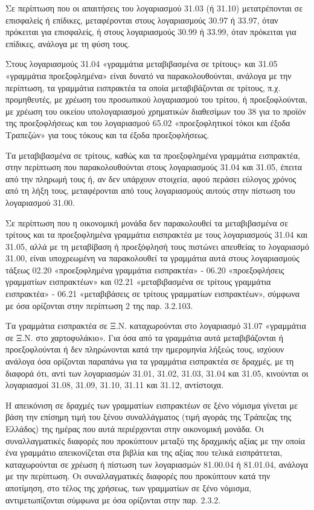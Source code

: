 \documentclass[A4,10pt,greek]{book}
\begin{document}
Σε περίπτωση που οι απαιτήσεις του λογαριασμού 31.03 (ή 31.10) μετατρέπονται σε επισφαλείς ή επίδικες, μεταφέρονται στους λογαριασμούς 30.97 ή 33.97, όταν πρόκειται για επισφαλείς, ή στους λογαριασμούς 30.99 ή 33.99, όταν πρόκειται για επίδικες, ανάλογα με τη φύση τους.

Στους λογαριασμούς 31.04 «γραμμάτια μεταβιβασμένα σε τρίτους» και 31.05 «γραμμάτια προεξοφλημένα» είναι δυνατό να παρακολουθούνται, ανάλογα με την περίπτωση, τα γραμμάτια εισπρακτέα τα οποία μεταβιβάζονται σε τρίτους, π.χ.  προμηθευτές, με χρέωση του προσωπικού λογαριασμού του τρίτου, ή προεξοφλούνται, με χρέωση του οικείου υπολογαριασμού χρηματικών διαθεσίμων του 38 για το προϊόν της προεξοφλήσεως και του λογαριασμού 65.02 «προεξοφλητικοί τόκοι και έξοδα Τραπεζών» για τους τόκους και τα έξοδα προεξοφλήσεως.

Τα μεταβιβασμένα σε τρίτους, καθώς και τα προεξοφλημένα γραμμάτια εισπρακτέα, στην περίπτωση που παρακολουθούνται στους λογαριασμούς 31.04 και 31.05, έπειτα από την πληρωμή τους ή, αν δεν υπάρχουν στοιχεία, αφού περάσει εύλογος χρόνος από τη λήξη τους, μεταφέρονται από τους λογαριασμούς αυτούς στην πίστωση του λογαριασμού 31.00.

Σε περίπτωση που η οικονομική μονάδα δεν παρακολουθεί τα μεταβιβασμένα σε τρίτους και τα προεξοφλημένα γραμμάτια εισπρακτέα με τους λογαριασμούς 31.04 και 31.05, αλλά με τη μεταβίβαση ή προεξόφλησή τους πιστώνει απευθείας το λογαριασμό 31.00, είναι υποχρεωμένη να παρακολουθεί τα γραμμάτια αυτά στους λογαριασμούς τάξεως 02.20 «προεξοφλημένα γραμμάτια εισπρακτέα» - 06.20 «προεξοφλήσεις γραμματίων εισπρακτέων» και 02.21 «μεταβιβασμένα σε τρίτους γραμμάτια εισπρακτέα» - 06.21 «μεταβιβάσεις σε τρίτους γραμματίων εισπρακτέων», σύμφωνα με όσα ορίζονται στην περίπτωση 2 της παρ. 3.2.103.

Τα γραμμάτια εισπρακτέα σε Ξ.Ν. καταχωρούνται στο λογαριασμό 31.07 «γραμμάτια σε Ξ.Ν. στο χαρτοφυλάκιο». Για όσα από τα γραμμάτια αυτά μεταβιβάζονται ή προεξοφλούνται ή δεν πληρώνονται κατά την ημερομηνία λήξεώς τους, ισχύουν ανάλογα όσα ορίζονται παραπάνω για τα γραμμάτια εισπρακτέα σε δραχμές, με τη διαφορά ότι, αντί των λογαριασμών 31.01, 31.02, 31.03, 31.04 και 31.05, κινούνται οι λογαριασμοί 31.08, 31.09, 31.10, 31.11 και 31.12, αντίστοιχα.

Η απεικόνιση σε δραχμές των γραμματίων εισπρακτέων σε ξένο νόμισμα γίνεται με βάση την επίσημη τιμή του ξένου συναλλάγματος (τιμή αγοράς της Τράπεζας της Ελλάδος) της ημέρας που αυτά περιέρχονται στην οικονομική μονάδα. Οι συναλλαγματικές διαφορές που προκύπτουν μεταξύ της δραχμικής αξίας με την οποία ένα γραμμάτιο απεικονίζεται στα βιβλία και της αξίας που τελικά εισπράττεται, καταχωρούνται σε χρέωση ή πίστωση των λογαριασμών 81.00.04 ή 81.01.04, ανάλογα με την περίπτωση. Οι συναλλαγματικές διαφορές που προκύπτουν κατά την αποτίμηση, στο τέλος της χρήσεως, των γραμματίων σε ξένο νόμισμα, αντιμετωπίζονται σύμφωνα με όσα ορίζονται στην παρ. 2.3.2.
\end{document}
